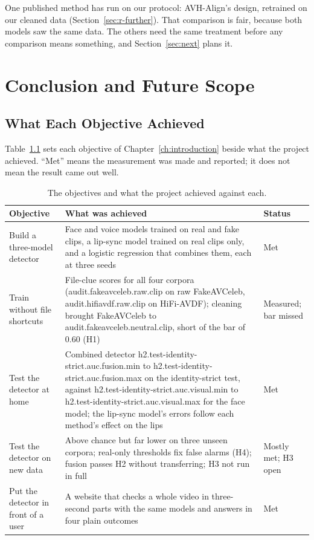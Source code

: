 One published method has run on our protocol: AVH-Align's design, retrained
on our cleaned data (Section~\ref{sec:r-further}). That comparison is fair,
because both models saw the same data. The others need the same treatment
before any comparison means something, and Section~\ref{sec:next} plans it.

%
\chapter{Conclusion and Future Scope}
\label{ch:conclusions}

\section{What Each Objective Achieved}

Table~\ref{tab:objectives} sets each objective of Chapter~\ref{ch:introduction}
beside what the project achieved. ``Met'' means the measurement was made and
reported; it does not mean the result came out well.

\begin{table}[ht]
    \centering
    \small
    \caption{The objectives and what the project achieved against each.}
    \label{tab:objectives}
    \begin{tabularx}{\textwidth}{@{}>{\raggedright\arraybackslash}p{3.4cm}>{\raggedright\arraybackslash}X l@{}}
        \toprule
        \textbf{Objective} & \textbf{What was achieved} & \textbf{Status} \\
        \midrule
        Build a three-model detector & Face and voice models trained on real and fake clips, a lip-sync model trained on real clips only, and a logistic regression that combines them, each at three seeds & Met \\
        Train without file shortcuts & File-clue scores for all four corpora ({{audit.fakeavceleb.raw.clip}} on raw FakeAVCeleb, {{audit.hifiavdf.raw.clip}} on HiFi-AVDF); cleaning brought FakeAVCeleb to {{audit.fakeavceleb.neutral.clip}}, short of the bar of 0.60 (H1) & Measured; bar missed \\
        Test the detector at home & Combined detector {{h2.test-identity-strict.auc.fusion.min}} to {{h2.test-identity-strict.auc.fusion.max}} on the identity-strict test, against {{h2.test-identity-strict.auc.visual.min}} to {{h2.test-identity-strict.auc.visual.max}} for the face model; the lip-sync model's errors follow each method's effect on the lips & Met \\
        Test the detector on new data & Above chance but far lower on three unseen corpora; real-only thresholds fix false alarms (H4); fusion passes H2 without transferring; H3 not run in full & Mostly met; H3 open \\
        Put the detector in front of a user & A website that checks a whole video in three-second parts with the same models and answers in four plain outcomes & Met \\
        \bottomrule
    \end{tabularx}
\end{table}

